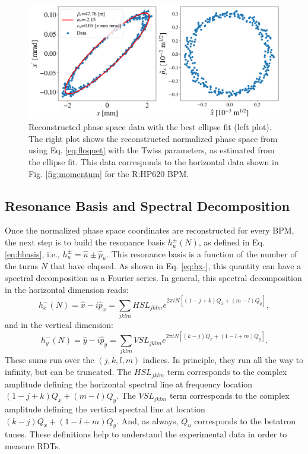 \begin{figure}[H]
    \centering
    \includegraphics[width=\columnwidth]{chapter4/ellipse_data.png}
    \caption{Reconstructed phase space data with the best ellipse fit (left plot). The right plot shows the reconstructed normalized phase space from using Eq. \ref{eq:floquet} with the Twiss parameters, as estimated from the ellipse fit. This data corresponds to the horizontal data shown in Fig. \ref{fig:momentum} for the R:HP620 BPM.}
    \label{fig:ellipse}
\end{figure}

\subsection{Resonance Basis and Spectral Decomposition}

Once the normalized phase space coordinates are reconstructed for every BPM, the next step is to build the resonance basis $h_u^{\pm}(N)$, as defined in Eq. \ref{eq:hbasis}, i.e., $h_u^{\pm}=\hat{u}\pm \hat{p}_u$. This resonance basis is a function of the number of the turns $N$ that have elapsed. As shown in Eq. \ref{eq:hx-}, this quantity can have a spectral decomposition as a Fourier series. In general, this spectral decomposition in the horizontal dimension reads: 
\begin{equation}
    \label{eq:hxspect}
    h_x^{-}(N)= \hat{x} - i\hat{p}_x = \sum_{jklm}HSL_{jklm}e^{2\pi i N \left[ \left( 1-j+k\right)Q_x+\left( m-l \right)Q_y\right]},
\end{equation}
and in the vertical dimension:
\begin{equation}
    \label{eq:hyspect}
    h_y^{-}(N)= \hat{y} - i\hat{p}_y = \sum_{jklm}VSL_{jklm}e^{2\pi i N \left[ \left( k-j\right)Q_x+\left(1-l+m \right)Q_y\right]}.
\end{equation}
These sums run over the $(j,k,l,m)$ indices. In principle, they run all the way to infinity, but can be truncated. The $HSL_{jklm}$ term corresponds to the complex amplitude defining the horizontal spectral line at frequency location $(1-j+k)Q_x+(m-l)Q_y$. The $VSL_{jklm}$ term corresponds to the complex amplitude defining the vertical spectral line at location $(k-j)Q_x+(1-l+m)Q_y$. And, as always, $Q_u$ corresponds to the betatron tunes. These definitions help to understand the experimental data in order to measure RDTs.

